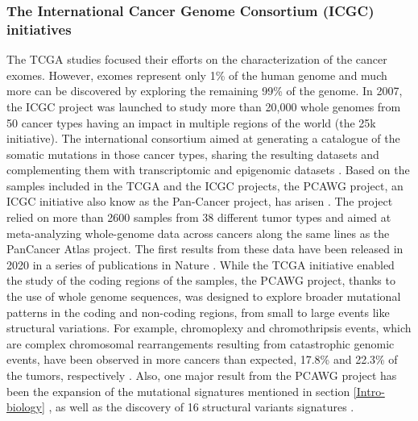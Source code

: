 \subsubsection*{The International Cancer Genome Consortium (ICGC) initiatives}
The \gls{TCGA} studies focused their efforts on the characterization of the cancer exomes. However, exomes represent only 1\% of the human genome and much more can be discovered by exploring the remaining 99\% of the genome. In 2007, the \gls{ICGC} project was launched to study more than 20,000 whole genomes from 50 cancer types having an impact in multiple regions of the world (the 25k initiative).  The international consortium aimed at generating a catalogue of the somatic mutations in those cancer types, sharing the resulting datasets and complementing them with transcriptomic and epigenomic datasets \cite{Hudson2010,Cieslik2020}.
Based on the samples included in the \gls{TCGA} and the \gls{ICGC} projects, the \gls{PCAWG} project, an \gls{ICGC} initiative also know as the Pan-Cancer project, has arisen \cite{Campbell2020}. The project relied on more than 2600 samples from 38 different tumor types and aimed at meta-analyzing whole-genome data across cancers along the same lines as the PanCancer Atlas project. The first results from these data have been released in 2020 in a series of publications in Nature \cite{Cieslik2020}. While the \gls{TCGA} initiative enabled the study of the coding regions of the samples, the \gls{PCAWG} project, thanks to the use of whole genome sequences, was designed to explore broader mutational patterns in the coding and non-coding regions, from small to large events like structural variations. For example, chromoplexy and chromothripsis events, which are complex chromosomal rearrangements resulting from catastrophic genomic events, have been observed in more cancers than expected, 17.8\% and 22.3\% of the tumors, respectively \cite{Cieslik2020}. Also, one major result from the \gls{PCAWG} project has been the expansion of the mutational signatures mentioned in section \ref{Intro-biology} \cite{Alexandrov2020}, as well as the discovery of 16 structural variants signatures \cite{Li2020}. 

